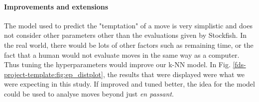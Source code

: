 \documentclass[10pt,a4paper]{article}
\begin{document}
\begin{multicols}{2}
\paragraph{Improvements and extensions}

The model used to predict the "temptation" of a move is very simplistic and does not consider other parameters other than the evaluations given by Stockfish. In the real world, there would be lots of other factors such as remaining time, or the fact that a human would not evaluate moves in the same way as a computer. Thus tuning the hyperparameters would improve our k-NN model. In Fig. \ref{fds-project-template:fig:ep_distplot}, the results that were displayed were what we were expecting in this study. If improved and tuned better, the idea for the model could be used to analyse moves beyond just \textit{en passant}.

\end{multicols}

\printbibliography
\end{document}
